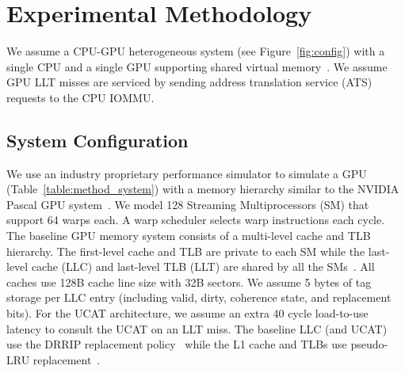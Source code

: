 


\section{Experimental Methodology}
\label{sec:method}

\noindent We assume a CPU-GPU heterogeneous system (see
Figure~\ref{fig:config}) with a single CPU and a single GPU supporting
shared virtual memory~\cite{intelgen9, amdzen, gpu_pascal}. We assume
GPU LLT misses are serviced by sending address translation service
(ATS) ~\cite{vesley2016ispass,ats_spec} requests to the CPU IOMMU.

\subsection{System Configuration}

\noindent We use an industry proprietary performance simulator to
simulate a GPU (Table~\ref{table:method_system}) with a memory
hierarchy similar to the NVIDIA Pascal GPU system~\cite{gpu_pascal}.
We model 128 Streaming Multiprocessors (SM) that support 64 warps
each. A warp scheduler selects warp instructions each cycle. The
baseline GPU memory system consists of a multi-level cache and TLB
hierarchy. The first-level cache and TLB are private to each SM while
the last-level cache (LLC) and last-level TLB (LLT) are shared by all
the SMs~\cite{SharedLLT}. All caches use 128B cache line size with 32B
sectors. We assume 5 bytes of tag storage per LLC entry (including
valid, dirty, coherence state, and replacement bits). For the UCAT
architecture, we assume an extra 40 cycle load-to-use latency to
consult the UCAT on an LLT miss. The baseline LLC (and UCAT) use the
DRRIP replacement policy~\cite{jaleel_rrip} while the L1 cache and
TLBs use pseudo-LRU replacement~\cite{jaleel_rrip}.


